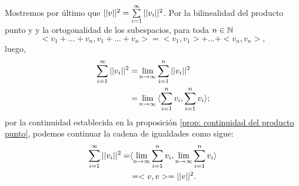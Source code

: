 \begin{itemize}
Mostremos por último que $|| v ||^{2} = \sum\limits_{i=1}^{\infty}|| v_{i} ||^{2} $.
Por la bilinealidad del producto punto y
y la ortogonalidad de los subespacios, para toda $n \in \mathbb{N}$
\[
< v_{1}+ \ldots + v_{n} , v_{1}+ \ldots + v_{n}  > =
< v_{1} , v_{1} > + \ldots + < v_{n} , v_{n} >,
\]
luego,
\begin{align*}
\sum\limits_{i=1}^{\infty}||v_{i}||^{2} = &
\lim\limits_{n \rightarrow \infty}{\sum\limits_{i=1}^{n}||v_{i}||^{2}} \\
= & \lim\limits_{n \rightarrow \infty}{\langle 
\sum\limits_{i=1}^{n}v_{i} , \sum\limits_{i=1}^{n}v_{i} \rangle };
\end{align*}
por la continuidad establecida en la 
proposición \ref{prop: continuidad del producto punto},
podemos continuar la cadena de igualdades como sigue:
\begin{align*}
\sum\limits_{i=1}^{\infty}||v_{i}||^{2} = & \langle  \lim\limits_{n \rightarrow \infty}{\sum\limits_{i=1}^{n}v_{i}} ,
 \lim\limits_{n \rightarrow \infty}{\sum\limits_{i=1}^{n}v_{i}} \rangle \\
 & = < v , v > = ||v||^{2}.
\end{align*}
\end{itemize}
\QEDB
\vspace{0.2cm}
\newpage